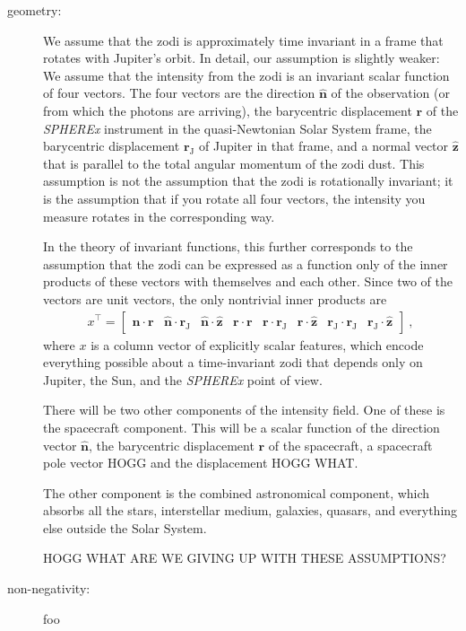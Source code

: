 \documentclass{article}
\renewcommand{\vec}[1]{\mathbf{#1}}
\begin{document}
\begin{description}
    \item[geometry:] We assume that the zodi is approximately time invariant in a frame that rotates with Jupiter's orbit.
    In detail, our assumption is slightly weaker:
    We assume that the intensity from the zodi is an invariant scalar function of four vectors.
    The four vectors are the direction $\vec{\hat{n}}$ of the observation (or from which the photons are arriving), the barycentric displacement $\vec{r}$ of the \textsl{SPHEREx} instrument in the quasi-Newtonian Solar System frame, the barycentric displacement $\vec{r}_\text{J}$ of Jupiter in that frame, and a normal vector $\vec{\hat{z}}$ that is parallel to the total angular momentum of the zodi dust.
    This assumption is not the assumption that the zodi is rotationally invariant; it is the assumption that if you rotate all four vectors, the intensity you measure rotates in the corresponding way.
    
    In the theory of invariant functions, this further corresponds to the assumption that the zodi can be expressed as a function only of the inner products of these vectors with themselves and each other.
    Since two of the vectors are unit vectors, the only nontrivial inner products are
    \begin{align}
        x^\top = \begin{bmatrix}\vec{\hat{n}} \cdot \vec{r} &
        \vec{\hat{n}} \cdot \vec{r}_\text{J} &
        \vec{\hat{n}} \cdot \vec{\hat{z}} &
        \vec{r} \cdot \vec{r} &
        \vec{r} \cdot \vec{r}_\text{J} &
        \vec{r} \cdot \vec{\hat{z}} &
        \vec{r}_\text{J} \cdot \vec{r}_\text{J} &
        \vec{r}_\text{J} \cdot \vec{\hat{z}} \end{bmatrix} ~,
    \end{align}
    where $x$ is a column vector of explicitly scalar features, which encode everything possible about a time-invariant zodi that depends only on Jupiter, the Sun, and the \textsl{SPHEREx} point of view.

    There will be two other components of the intensity field.
    One of these is the spacecraft component.
    This will be a scalar function of the direction vector $\vec{\hat{n}}$, the barycentric displacement $\vec{r}$ of the spacecraft, a spacecraft pole vector HOGG and the displacement HOGG WHAT.

    The other component is the combined astronomical component, which absorbs all the stars, interstellar medium, galaxies, quasars, and everything else outside the Solar System.
    

    HOGG WHAT ARE WE GIVING UP WITH THESE ASSUMPTIONS?

    \item[non-negativity:] foo
\end{description}
\end{document}
